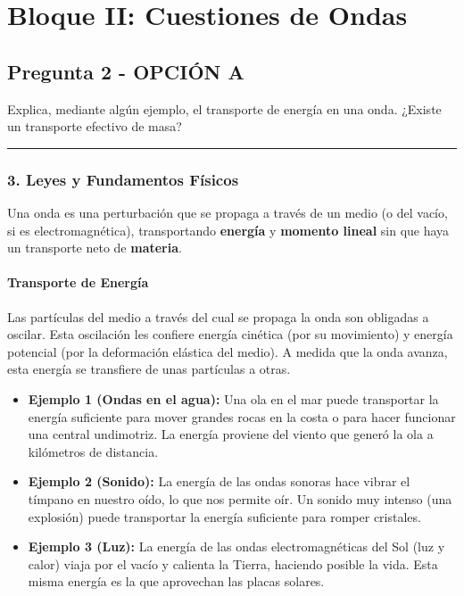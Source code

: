 \newpage

\section{Bloque II: Cuestiones de Ondas}
\label{sec:ondas_2004_jun_ord}

\subsection{Pregunta 2 - OPCIÓN A}
\label{subsec:2A_2004_jun_ord}

\begin{cajaenunciado}
Explica, mediante algún ejemplo, el transporte de energía en una onda. ¿Existe un transporte efectivo de masa?
\end{cajaenunciado}
\hrule

\subsubsection*{3. Leyes y Fundamentos Físicos}
Una onda es una perturbación que se propaga a través de un medio (o del vacío, si es electromagnética), transportando \textbf{energía} y \textbf{momento lineal} sin que haya un transporte neto de \textbf{materia}.
\paragraph*{Transporte de Energía}
Las partículas del medio a través del cual se propaga la onda son obligadas a oscilar. Esta oscilación les confiere energía cinética (por su movimiento) y energía potencial (por la deformación elástica del medio). A medida que la onda avanza, esta energía se transfiere de unas partículas a otras.
\begin{itemize}
    \item \textbf{Ejemplo 1 (Ondas en el agua):} Una ola en el mar puede transportar la energía suficiente para mover grandes rocas en la costa o para hacer funcionar una central undimotriz. La energía proviene del viento que generó la ola a kilómetros de distancia.
    \item \textbf{Ejemplo 2 (Sonido):} La energía de las ondas sonoras hace vibrar el tímpano en nuestro oído, lo que nos permite oír. Un sonido muy intenso (una explosión) puede transportar la energía suficiente para romper cristales.
    \item \textbf{Ejemplo 3 (Luz):} La energía de las ondas electromagnéticas del Sol (luz y calor) viaja por el vacío y calienta la Tierra, haciendo posible la vida. Esta misma energía es la que aprovechan las placas solares.
\end{itemize}
